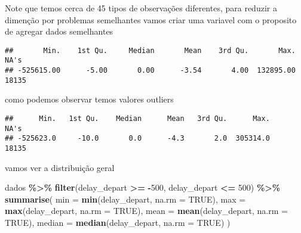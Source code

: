 \documentclass[
]{article}
\newenvironment{Shaded}{\begin{snugshade}}{\end{snugshade}}
\newcommand{\AttributeTok}[1]{\textcolor[rgb]{0.13,0.29,0.53}{#1}}
\newcommand{\ConstantTok}[1]{\textcolor[rgb]{0.56,0.35,0.01}{#1}}
\newcommand{\DecValTok}[1]{\textcolor[rgb]{0.00,0.00,0.81}{#1}}
\newcommand{\FunctionTok}[1]{\textcolor[rgb]{0.13,0.29,0.53}{\textbf{#1}}}
\newcommand{\NormalTok}[1]{#1}
\newcommand{\SpecialCharTok}[1]{\textcolor[rgb]{0.81,0.36,0.00}{\textbf{#1}}}
\begin{document}
Note que temos cerca de 45 tipos de observações diferentes, para reduzir
a dimenção por problemas semelhantes vamos criar uma variavel com o
proposito de agregar dados semelhantes

\begin{Shaded}
\end{Shaded}

\begin{verbatim}
##       Min.    1st Qu.     Median       Mean    3rd Qu.       Max.       NA's 
## -525615.00      -5.00       0.00      -3.54       4.00  132895.00      18135
\end{verbatim}

como podemos observar temos valores outliers

\begin{Shaded}
\end{Shaded}

\begin{verbatim}
##      Min.   1st Qu.    Median      Mean   3rd Qu.      Max.      NA's 
## -525623.0     -10.0       0.0      -4.3       2.0  305314.0     18135
\end{verbatim}

vamos ver a distribuição geral

\begin{Shaded}
\begin{Highlighting}[]
\NormalTok{dados }\SpecialCharTok{\%\textgreater{}\%}
  \FunctionTok{filter}\NormalTok{(delay\_depart }\SpecialCharTok{\textgreater{}=} \SpecialCharTok{{-}}\DecValTok{500}\NormalTok{, delay\_depart }\SpecialCharTok{\textless{}=} \DecValTok{500}\NormalTok{) }\SpecialCharTok{\%\textgreater{}\%}
  \FunctionTok{summarise}\NormalTok{(}
    \AttributeTok{min =} \FunctionTok{min}\NormalTok{(delay\_depart, }\AttributeTok{na.rm =} \ConstantTok{TRUE}\NormalTok{),}
    \AttributeTok{max =} \FunctionTok{max}\NormalTok{(delay\_depart, }\AttributeTok{na.rm =} \ConstantTok{TRUE}\NormalTok{),}
    \AttributeTok{mean =} \FunctionTok{mean}\NormalTok{(delay\_depart, }\AttributeTok{na.rm =} \ConstantTok{TRUE}\NormalTok{),}
    \AttributeTok{median =} \FunctionTok{median}\NormalTok{(delay\_depart, }\AttributeTok{na.rm =} \ConstantTok{TRUE}\NormalTok{)}
\NormalTok{  )}
\end{Highlighting}
\end{Shaded}
\end{document}
